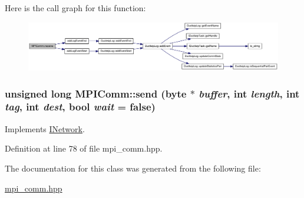 Here is the call graph for this function:\nopagebreak
\begin{figure}[H]
\begin{center}
\leavevmode
\includegraphics[width=420pt]{class_m_p_i_comm_abdd86a365a50571e7a46e8593c45977b_cgraph}
\end{center}
\end{figure}
\hypertarget{class_m_p_i_comm_a878df4e9c57f117f192a8bfee009ff94}{
\subsubsection[{send}]{\setlength{\rightskip}{0pt plus 5cm}unsigned long MPIComm::send ({\bf byte} $\ast$ {\em buffer}, \/  int {\em length}, \/  int {\em tag}, \/  int {\em dest}, \/  bool {\em wait} = {\ttfamily false})}}
\label{class_m_p_i_comm_a878df4e9c57f117f192a8bfee009ff94}


Implements \hyperlink{class_i_network_a4996a6c20805f604c5afff707313ed4e}{INetwork}.

Definition at line 78 of file mpi\_\-comm.hpp.

The documentation for this class was generated from the following file:\begin{DoxyCompactItemize}
\item 
\hyperlink{mpi__comm_8hpp}{mpi\_\-comm.hpp}\end{DoxyCompactItemize}
